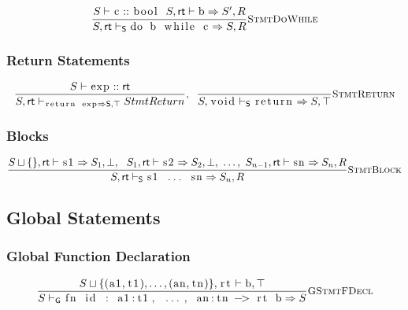 \documentclass{article}
\newcommand{\code}[1]{\lstinline[columns=fixed]{#1}}
\newcommand{\drmrule}[5]{\frac{#1}{#2\vdash_{\mathsf{#3}}#4}\textsc{\small{#5}}}
\begin{document}
				\begin{align*}
					\drmrule{S\vdash\textnormal{\code{c}} :: \textnormal{\code{bool}}\ \ S,\mathsf{rt}\vdash\textnormal{\code{b}}\Rightarrow S',R}{S,\mathsf{rt}}{S}{\textnormal{\code{do b while c}} \Rightarrow S,R}{StmtDoWhile}
				\end{align*}
			
			\subsubsection{Return Statements}
			
				\begin{align*}
					\drmrule{S\vdash\textnormal{\code{exp}}::\mathsf{rt}}{S,\mathsf{rt}}{\textnormal{\code{return exp}} \Rightarrow S,\top}{StmtReturn},\ \ \drmrule{}{S,\textnormal{\code{void}}}{S}{\textnormal{\code{return}}\Rightarrow S,\top}{StmtReturn}
				\end{align*}
				
			\subsubsection{Blocks}
			
				\begin{align*}
					\drmrule{S\sqcup\{\},\mathsf{rt}\vdash\textnormal{\code{s1}} \Rightarrow S_1,\bot,\ \ S_1,\mathsf{rt}\vdash\textnormal{\code{s2}} \Rightarrow S_2,\bot,\ \dots,\ S_{n-1},\mathsf{rt}\vdash\textnormal{\code{sn}} \Rightarrow S_n,R}{S,\mathsf{rt}}{S}{\textnormal{\code{s1 ... sn}} \Rightarrow S_n,R}{StmtBlock}
				\end{align*}
		
		\subsection{Global Statements}
		
			\subsubsection{Global Function Declaration}
			
				\begin{align*}
					\drmrule{S\sqcup\{(\textnormal{\code{a1}},\textnormal{\code{t1}}),\dots,(\textnormal{\code{an}},\textnormal{\code{tn}})\},\textnormal{\code{rt}} \vdash \textnormal{\code{b}},\top}{S}{G}{\textnormal{\code{fn id : a1:t1, ..., an:tn -> rt b}} \Rightarrow S}{GStmtFDecl}
				\end{align*}
			
\end{document}
